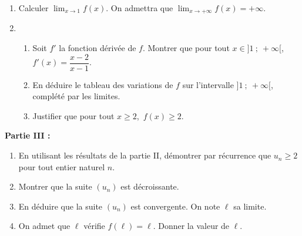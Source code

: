 \documentclass[11pt]{article}
\begin{document}
\begin{enumerate}
\item Calculer $\displaystyle\lim_{x \to 1} f(x)$. On admettra que $\displaystyle\lim_{x \to + \infty} f(x) = + \infty$.
\item  
	\begin{enumerate}
		\item Soit $f'$ la fonction dérivée de $f$. Montrer que pour tout $x \in ]1~;~ +\infty[$,\,  $f'(x) = \dfrac{x - 2}{x - 1}$.
		\item En déduire le tableau des variations de $f$ sur l'intervalle $]1~;~ +\infty[$, complété par les limites.
		\item Justifier que pour tout $x
\geqslant  2$,\,  $f(x) \geqslant  2$.
	\end{enumerate}
\end{enumerate}

\bigskip

\textbf{Partie III :}

\medskip

\begin{enumerate}
\item En utilisant les résultats de la partie II, démontrer par récurrence que $u_n \geqslant  2$ pour tout entier naturel $n$.
\item Montrer que la suite $\left(u_n\right)$ est décroissante.
\item En déduire que la suite $\left(u_n\right)$ est convergente. On note $\ell$ sa limite.
\item On admet que $\ell$ vérifie $f(\ell) = \ell$. Donner la valeur de $\ell$.
\end{enumerate}
\end{document}
